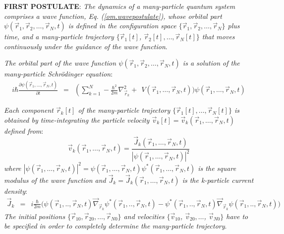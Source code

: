 \documentclass[onecolumn,nofootinbib, secnumarabic, amsmath, nobibnotes,12pt,aps,pra]{revtex4-1}
\newcommand{\eref}[1]{Eq. (\ref{#1})}
\begin{document}
\noindent\textbf{FIRST POSTULATE}: \textit{The dynamics of a many-particle quantum  system comprises a wave function,
\eref{om.wavepostulate}, whose orbital  part $\psi(\vec r_1,\vec r_2,\ldots,\vec r_N,t)$ is defined in the configuration space 
$\{\vec r_1,\vec r_2,\ldots,\vec r_N\}$ plus time, and a many-particle trajectory $\{\vec r_1[t]$, $\vec r_2[t],\ldots,\vec r_N[t]\}$ that moves continuously under the guidance of the wave function}.

\textit{The orbital part of the wave function $\psi(\vec r_1,\vec r_2,\ldots,\vec r_N,t)$ is a solution of the many-particle Schr\"odinger equation}:
\begin{eqnarray*}
i \hbar \frac{\partial \psi(\vec r_{1},\ldots,\vec
r_{N},t)}{\partial t} &=& \left( \sum_{k = 1}^N -\frac{\hbar^2}{2m}
\nabla^2_{\vec r_k} \right.+\ \ V(\vec r_{1},\ldots,\vec r_{N},t) \Bigg)
\psi(\vec r_{1},\ldots,\vec r_{N},t)
\end{eqnarray*}

\textit{Each component $\vec r_k[t]$ of the many-particle trajectory  $\{\vec r_1[t],\ldots,\vec r_N[t]\}$ is obtained by time-integrating the particle velocity $\vec v_k[t] = \vec v_k(\vec r_1,\ldots,\vec r_N,t)$ defined from}:
\begin{equation}
\vec v_k(\vec r_1,\ldots,\vec r_N,t) = \frac{\vec J_k(\vec r_1,\ldots,\vec r_N,t)} {|\psi(\vec r_1,\ldots,\vec r_N,t)|^2}
\nonumber
\end{equation}
\textit{where $|\psi(\vec r_1,\ldots,\vec r_N,t)|^2 = \psi(\vec
r_1,\ldots,\vec r_N,t) \psi^*(\vec r_1,\ldots,\vec r_N,t)$ is the
square modulus of the wave function and $\vec J_k = \vec J_k(\vec
r_1,\ldots,\vec r_N,t)$ is the k-particle  current density}:
\begin{eqnarray*}
\vec J_k &=& i \frac {\hbar} {2m} \Big(\psi(\vec r_1,..,\vec r_N,t) \vec \nabla_{\vec{r}_k} {\psi^{*}(\vec r_1,..,\vec r_N,t)}-\psi^{*}(\vec r_1,..,\vec r_N,t) \vec \nabla_{\vec{r}_k} \psi(\vec r_1,..,\vec r_N,t) \Big)
\end{eqnarray*}
\textit{The initial positions $\{\vec r_{10},\vec r_{20},\ldots,\vec r_{N0}\}$ and
velocities $\{\vec v_{10}$, $\vec v_{20},\ldots$, $\vec v_{N0}\}$ have to be specified in order to completely determine the many-particle trajectory}.\\
\end{document}
